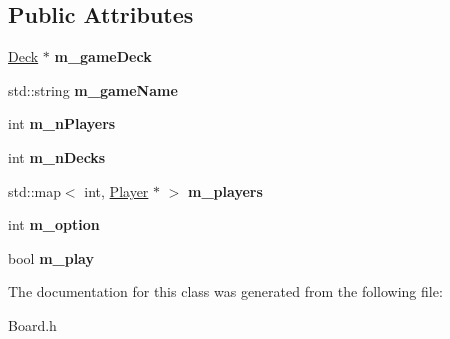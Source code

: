 \subsection*{Public Attributes}
\begin{DoxyCompactItemize}
\item 
\hyperlink{class_deck}{Deck} $\ast$ {\bfseries m\+\_\+game\+Deck}\hypertarget{class_board_ada80a0972dfb2b375ad2eb511fd279a8}{}\label{class_board_ada80a0972dfb2b375ad2eb511fd279a8}

\item 
std\+::string {\bfseries m\+\_\+game\+Name}\hypertarget{class_board_aa121c9783dc8594d62d7029d952f13aa}{}\label{class_board_aa121c9783dc8594d62d7029d952f13aa}

\item 
int {\bfseries m\+\_\+n\+Players}\hypertarget{class_board_a97a72d923bd0e2700f4b14a7310f9654}{}\label{class_board_a97a72d923bd0e2700f4b14a7310f9654}

\item 
int {\bfseries m\+\_\+n\+Decks}\hypertarget{class_board_a5e1be4593464a9cce5686f1e270336b3}{}\label{class_board_a5e1be4593464a9cce5686f1e270336b3}

\item 
std\+::map$<$ int, \hyperlink{class_player}{Player} $\ast$ $>$ {\bfseries m\+\_\+players}\hypertarget{class_board_a1f6a9b7c28344b393ec4e262a7869259}{}\label{class_board_a1f6a9b7c28344b393ec4e262a7869259}

\item 
int {\bfseries m\+\_\+option}\hypertarget{class_board_a49016c4ad23c494dcae6147aa9d6f975}{}\label{class_board_a49016c4ad23c494dcae6147aa9d6f975}

\item 
bool {\bfseries m\+\_\+play}\hypertarget{class_board_ada2cc1a54947326ba7560ab113295c06}{}\label{class_board_ada2cc1a54947326ba7560ab113295c06}

\end{DoxyCompactItemize}


The documentation for this class was generated from the following file\+:\begin{DoxyCompactItemize}
\item 
Board.\+h\end{DoxyCompactItemize}
